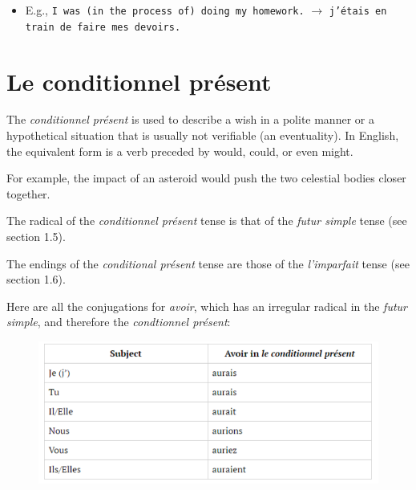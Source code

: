 \documentclass[11pt, oneside]{book}
\begin{document}
{\begin{description}
		\begin{itemize}
			\textcolor{white}{a} 
			\item[] E.g., \texttt{I was (in the process of) doing my homework.} $\rightarrow$ \texttt{j'\'etais en train de faire mes devoirs.}
		\end{itemize}
			
		
\end{description}

\section{Le conditionnel pr\'esent} 

The \textit{conditionnel pr\'esent} is used to describe a wish in a polite manner or a hypothetical situation that is usually not verifiable (an eventuality). In English, the equivalent form is a verb preceded by would, could, or even might. \vspace{0.5\baselineskip}

For example, the impact of an asteroid would push the two celestial bodies closer together. \vspace{0.5\baselineskip}

The radical of the \textit{conditionnel pr\'esent} tense is that of the \textit{futur simple} tense (see section 1.5). \vspace{0.5\baselineskip}

The endings of the \textit{conditional pr\'esent} tense are those of the \textit{l'imparfait} tense (see section 1.6).  \vspace{0.5\baselineskip}

Here are all the conjugations for \textit{avoir}, which has an irregular radical in the \textit{futur simple}, and therefore the \textit{condtionnel pr\'esent}:  \vspace{0.5\baselineskip}

\begin{figure}[H]
	\includegraphics[scale=0.6]{charts/conditionnelAvoir.png}
\end{figure} \vspace{0.5\baselineskip}


}
\end{document}
